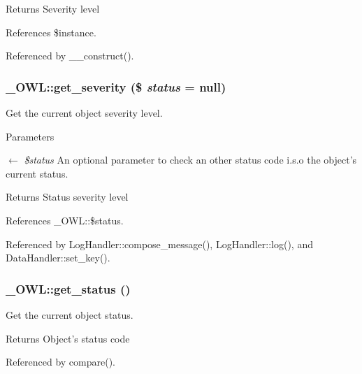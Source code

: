 \begin{DoxyReturn}{Returns}
Severity level 
\end{DoxyReturn}


References \$instance.



Referenced by \_\-\_\-construct().

\subsubsection[{get\_\-severity}]{\setlength{\rightskip}{0pt plus 5cm}\_\-OWL::get\_\-severity (\$ {\em status} = {\ttfamily null})}\label{class__OWL_adf9509ef96858be7bdd9414c5ef129aa}
Get the current object severity level.


\begin{DoxyParams}{Parameters}
\item[\mbox{$\leftarrow$} {\em \$status}]An optional parameter to check an other status code i.s.o the object's current status. \end{DoxyParams}
\begin{DoxyReturn}{Returns}
Status severity level 
\end{DoxyReturn}


References \_\-OWL::\$status.



Referenced by LogHandler::compose\_\-message(), LogHandler::log(), and DataHandler::set\_\-key().

\subsubsection[{get\_\-status}]{\setlength{\rightskip}{0pt plus 5cm}\_\-OWL::get\_\-status ()}\label{class__OWL_a99ec771fa2c5c279f80152cc09e489a8}
Get the current object status.

\begin{DoxyReturn}{Returns}
Object's status code 
\end{DoxyReturn}


Referenced by compare().

